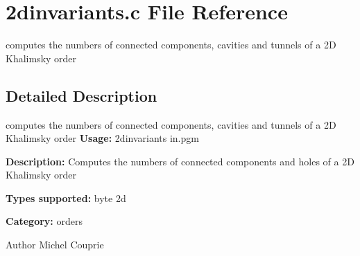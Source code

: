\section{2dinvariants.c File Reference}
\label{2dinvariants_8c}


computes the numbers of connected components, cavities and tunnels of a 2D Khalimsky order  




\subsection{Detailed Description}
computes the numbers of connected components, cavities and tunnels of a 2D Khalimsky order {\bfseries Usage:} 2dinvariants in.pgm

{\bfseries Description:} Computes the numbers of connected components and holes of a 2D Khalimsky order

{\bfseries Types supported:} byte 2d

{\bfseries Category:} orders

\begin{DoxyAuthor}{Author}
Michel Couprie 
\end{DoxyAuthor}
